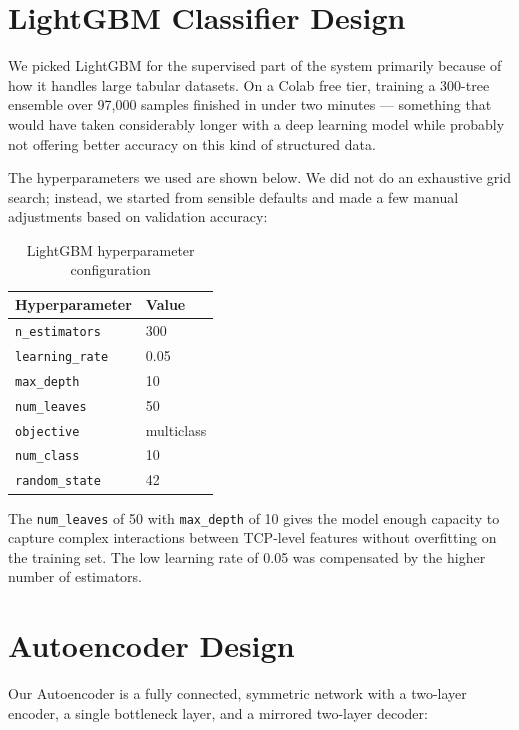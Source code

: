 \documentclass[12pt,a4paper]{report}
\begin{document}
\section{LightGBM Classifier Design}

We picked LightGBM for the supervised part of the system primarily because of
how it handles large tabular datasets. On a Colab free tier, training a 300-tree
ensemble over 97,000 samples finished in under two minutes — something that would
have taken considerably longer with a deep learning model while probably not
offering better accuracy on this kind of structured data.

\noindent The hyperparameters we used are shown below. We did not do an exhaustive
grid search; instead, we started from sensible defaults and made a few manual
adjustments based on validation accuracy:

\begin{table}[H]
\centering
\caption{LightGBM hyperparameter configuration}
\label{tab:lgbm_params}
\begin{tabular}{ll}
\toprule
\textbf{Hyperparameter} & \textbf{Value} \\
\midrule
\texttt{n\_estimators}   & 300 \\
\texttt{learning\_rate}  & 0.05 \\
\texttt{max\_depth}      & 10 \\
\texttt{num\_leaves}     & 50 \\
\texttt{objective}       & multiclass \\
\texttt{num\_class}      & 10 \\
\texttt{random\_state}   & 42 \\
\bottomrule
\end{tabular}
\end{table}

\noindent The \texttt{num\_leaves} of 50 with \texttt{max\_depth} of 10 gives the
model enough capacity to capture complex interactions between TCP-level features
without overfitting on the training set. The low learning rate of 0.05 was
compensated by the higher number of estimators.

\section{Autoencoder Design}

Our Autoencoder is a fully connected, symmetric network with a two-layer encoder,
a single bottleneck layer, and a mirrored two-layer decoder:
\end{document}

